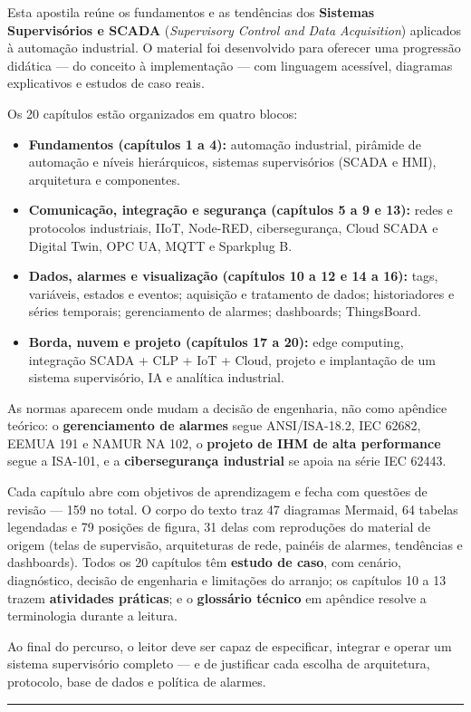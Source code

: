 Esta apostila reúne os fundamentos e as tendências dos \textbf{Sistemas Supervisórios e SCADA} (\emph{Supervisory Control and Data Acquisition}) aplicados à automação industrial. O material foi desenvolvido para oferecer uma progressão didática --- do conceito à implementação --- com linguagem acessível, diagramas explicativos e estudos de caso reais.

Os 20 capítulos estão organizados em quatro blocos:

\begin{itemize}
\tightlist
\item
  \textbf{Fundamentos (capítulos 1 a 4):} automação industrial, pirâmide de automação e níveis hierárquicos, sistemas supervisórios (SCADA e HMI), arquitetura e componentes.
\item
  \textbf{Comunicação, integração e segurança (capítulos 5 a 9 e 13):} redes e protocolos industriais, IIoT, Node-RED, cibersegurança, Cloud SCADA e Digital Twin, OPC UA, MQTT e Sparkplug B.
\item
  \textbf{Dados, alarmes e visualização (capítulos 10 a 12 e 14 a 16):} tags, variáveis, estados e eventos; aquisição e tratamento de dados; historiadores e séries temporais; gerenciamento de alarmes; dashboards; ThingsBoard.
\item
  \textbf{Borda, nuvem e projeto (capítulos 17 a 20):} edge computing, integração SCADA + CLP + IoT + Cloud, projeto e implantação de um sistema supervisório, IA e analítica industrial.
\end{itemize}

As normas aparecem onde mudam a decisão de engenharia, não como apêndice teórico: o \textbf{gerenciamento de alarmes} segue ANSI/ISA-18.2, IEC 62682, EEMUA 191 e NAMUR NA 102, o \textbf{projeto de IHM de alta performance} segue a ISA-101, e a \textbf{cibersegurança industrial} se apoia na série IEC 62443.

Cada capítulo abre com objetivos de aprendizagem e fecha com questões de revisão --- 159 no total. O corpo do texto traz 47 diagramas Mermaid, 64 tabelas legendadas e 79 posições de figura, 31 delas com reproduções do material de origem (telas de supervisão, arquiteturas de rede, painéis de alarmes, tendências e dashboards). Todos os 20 capítulos têm \textbf{estudo de caso}, com cenário, diagnóstico, decisão de engenharia e limitações do arranjo; os capítulos 10 a 13 trazem \textbf{atividades práticas}; e o \textbf{glossário técnico} em apêndice resolve a terminologia durante a leitura.

Ao final do percurso, o leitor deve ser capaz de especificar, integrar e operar um sistema supervisório completo --- e de justificar cada escolha de arquitetura, protocolo, base de dados e política de alarmes.

\begin{center}\rule{0.5\linewidth}{0.5pt}\end{center}
